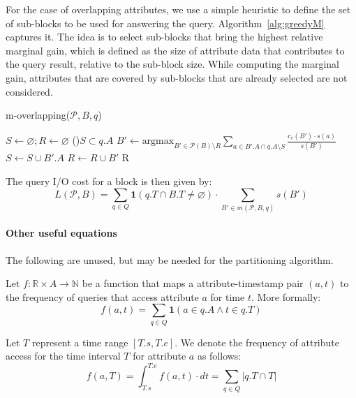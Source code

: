 \documentclass[twocolumn]{svjour3}          %
\let\emptyset\varnothing
\begin{document}
For the case of overlapping attributes, we use a simple heuristic to define the
set of sub-blocks to be used for answering the query.
Algorithm~\ref{alg:greedyM} captures it. The idea is to select sub-blocks that
bring the highest relative marginal gain, which is defined as the size of
attribute data that contributes to the query result, relative to the sub-block
size. While computing the marginal gain, attributes that are covered by
sub-blocks that are already selected are not considered.
%
\begin{algorithm}[h]
\scriptsize
\caption{m-overlapping($\mathcal{P}, B, q$)}
\label{alg:greedyM}
$S\leftarrow \emptyset; R\leftarrow \emptyset$ 
\While(){$S \subset q.A$}{
  $B' \leftarrow \mbox{argmax}_{B'\in\mathcal{P}(B)\setminus R} \sum_{a\in B'.A \cap q.A \setminus S} \frac{c_e(B') \cdot s(a)}{s(B')}$
  $S \leftarrow S \cup B'.A$
  $R\leftarrow R \cup B'$
}
\Return R 
\end{algorithm} 
%
The query I/O cost for a block is then given by:
\begin{equation}
L(\mathcal{P}, B) = \sum_{q\in Q} \mathbf{1}(q.T \cap B.T \neq \emptyset) \cdot \sum_{B'\in m(\mathcal{P}, B, q)} s(B')
\end{equation}


\paragraph{\textbf{Other useful equations}}

\noindent The following are unused, but may be needed for the partitioning
algorithm.

Let $f: \mathbb{R}\times A \rightarrow \mathbb{N}$ be a function that maps a
attribute-timestamp pair $(a, t)$ to the frequency of queries that access
attribute $a$ for time $t$. More formally:
\begin{equation}
f(a,t) = \sum_{q\in Q} \textbf{1}(a\in q.A \wedge t\in q.T)
\end{equation}
 
Let $T$ represent a time range $[T.s, T.e]$. We denote the frequency of
attribute access for the time interval $T$ for attribute $a$ as follows:
\begin{equation}
f(a, T) = \int_{T.s}^{T.e} f(a, t)\cdot dt =  \sum_{q\in Q} |q.T \cap T| 
\end{equation}
\end{document}
